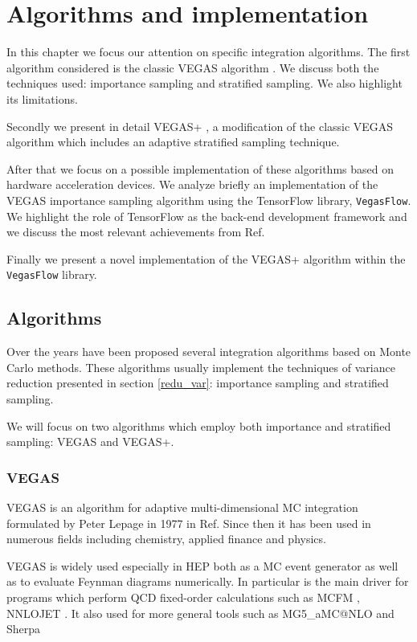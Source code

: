 \documentclass[../main/main.tex]{subfiles}
\begin{document}
\chapter[Algorithms and implementation]{Algorithms and implementation}
In this chapter we focus our attention on specific integration algorithms. 
The first algorithm considered is the classic VEGAS algorithm \cite{Lepage:1977sw}. We discuss both the techniques used: importance sampling and stratified sampling. We also highlight its limitations.

Secondly we present in detail VEGAS+ \cite{Lepage:2020tgj}, a modification of the classic VEGAS algorithm which includes an adaptive stratified sampling technique.

After that we focus on a possible implementation of these algorithms based on hardware acceleration devices.
We analyze briefly an implementation of the VEGAS importance sampling algorithm using the TensorFlow library, \texttt{VegasFlow}. We highlight the role of TensorFlow as the back-end development framework and we discuss the most relevant achievements from Ref\cite{Carrazza:2020rdn}.

Finally we present a novel implementation of the VEGAS+ algorithm within the \texttt{VegasFlow} library. 

 
	
\section{Algorithms}
Over the years have been proposed several integration algorithms based on Monte Carlo methods.
These algorithms usually implement the techniques of variance reduction presented in section \ref{redu_var}: importance sampling and stratified sampling.

We will focus on two algorithms which employ both importance and stratified sampling: VEGAS and VEGAS+.

\subsection{VEGAS}
\label{vegas}
VEGAS is an algorithm for adaptive multi-dimensional MC integration formulated by Peter Lepage in 1977 in Ref\cite{Lepage:1977sw}.
Since then it has been used in numerous fields including chemistry, applied finance and physics.

VEGAS is widely used especially in HEP both as a MC event generator as well as to evaluate Feynman diagrams numerically.
In particular is the main driver for programs which perform QCD fixed-order calculations such as MCFM \cite{Campbell:2015qma, Campbell:2019dru}, NNLOJET \cite{Gehrmann:2018szu}. It also used for more general tools such as MG5\_aMC@NLO \cite{Alwall:2014hca} and Sherpa \cite{Gleisberg:2008ta} 
 
\end{document}
